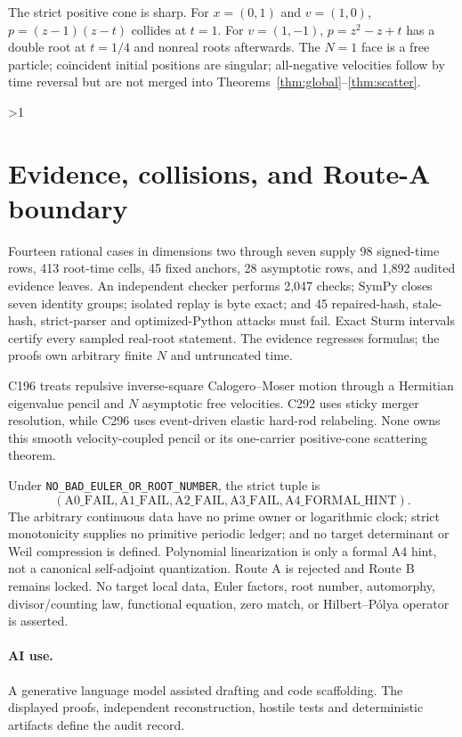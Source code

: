 \documentclass[10pt]{article}
\providecommand{\CRevisionRound}{2}
\begin{document}
The strict positive cone is sharp.  For $x=(0,1)$ and $v=(1,0)$,
$p=(z-1)(z-t)$ collides at $t=1$.  For $v=(1,-1)$,
$p=z^2-z+t$ has a double root at $t=1/4$ and nonreal roots afterwards.
The $N=1$ face is a free particle; coincident initial positions are singular;
all-negative velocities follow by time reversal but are not merged into
Theorems~\ref{thm:global}--\ref{thm:scatter}.
\fi

\ifnum\CRevisionRound>1
\section{Evidence, collisions, and Route-A boundary}
Fourteen rational cases in dimensions two through seven supply 98
signed-time rows, 413 root-time cells, 45 fixed anchors, 28 asymptotic rows,
and 1,892 audited evidence leaves.  An independent checker performs 2,047
checks; SymPy closes seven identity groups; isolated replay is byte exact;
and 45 repaired-hash, stale-hash, strict-parser and optimized-Python attacks
must fail.  Exact Sturm intervals certify every sampled real-root statement.
The evidence regresses formulas; the proofs own arbitrary finite $N$ and
untruncated time.

C196 treats repulsive inverse-square Calogero--Moser motion through a
Hermitian eigenvalue pencil and $N$ asymptotic free velocities.  C292 uses
sticky merger resolution, while C296 uses event-driven elastic hard-rod
relabeling.  None owns this smooth velocity-coupled pencil or its
one-carrier positive-cone scattering theorem.

Under \texttt{NO\_BAD\_EULER\_OR\_ROOT\_NUMBER}, the strict tuple is
\[
 (\mathrm{A0\_FAIL},\mathrm{A1\_FAIL},\mathrm{A2\_FAIL},
  \mathrm{A3\_FAIL},\mathrm{A4\_FORMAL\_HINT}).
\]
The arbitrary continuous data have no prime owner or logarithmic clock;
strict monotonicity supplies no primitive periodic ledger; and no target
determinant or Weil compression is defined.  Polynomial linearization is
only a formal A4 hint, not a canonical self-adjoint quantization.  Route A
is rejected and Route B remains locked.  No target local data, Euler
factors, root number, automorphy, divisor/counting law, functional equation,
zero match, or Hilbert--P\'olya operator is asserted.

\paragraph{AI use.} A generative language model assisted drafting and code
scaffolding.  The displayed proofs, independent reconstruction, hostile
tests and deterministic artifacts define the audit record.
\fi
\end{document}
